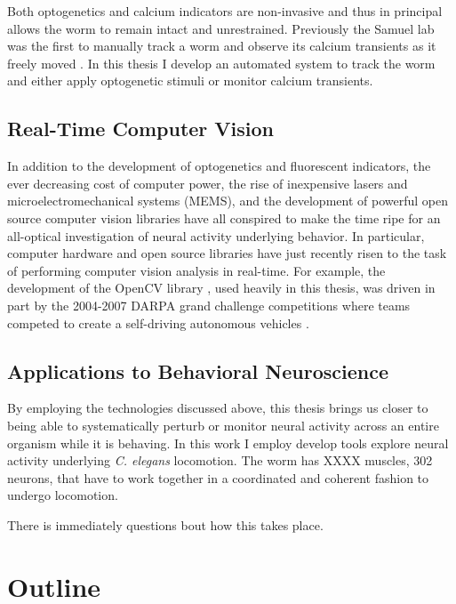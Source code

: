 Both optogenetics and calcium indicators are non-invasive and thus in principal allows the worm to remain intact and unrestrained. Previously the Samuel lab was the first to manually track a worm and observe its calcium transients as it freely moved \citep{clark_temporal_2007}. In this thesis I develop an automated system to track the worm and either apply optogenetic stimuli or monitor calcium transients.



\subsection{Real-Time Computer Vision}
In addition to the development of optogenetics and fluorescent indicators, the ever decreasing cost of computer power, the rise of inexpensive lasers and microelectromechanical systems (MEMS), and the development of powerful open source computer vision libraries have  all conspired to make the time ripe for an all-optical investigation of neural activity underlying behavior. In particular, computer hardware and open source libraries have just recently risen to the task of performing computer vision analysis in real-time. For example, the development of the OpenCV library \citep{bradski_opencv_2000,bradski_learning_2008}, used heavily in this thesis, was driven in part by the 2004-2007 DARPA grand challenge competitions where teams competed to create a self-driving autonomous vehicles \citep{stavens_learning_2011,buehler_stanley:_2007}.



\subsection{Applications to Behavioral Neuroscience}

By employing the technologies discussed above, this thesis brings us  closer to being able to systematically perturb or monitor neural activity across an entire organism while it is behaving. In this work I employ develop tools explore  neural activity underlying \emph{C. elegans} locomotion. The worm has XXXX muscles, 302 neurons, that have to work together in a coordinated and coherent fashion to undergo locomotion. 



There is immediately questions bout how this takes place. 



\section{Outline}
